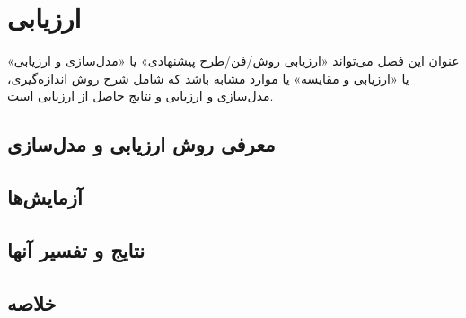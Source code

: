 
\chapter{ارزیابی}\label{chapter:4}
\thispagestyle{empty}
عنوان این فصل می‌تواند «ارزیابی روش/فن/طرح پیشنهادی» یا «مدل‌سازی و ارزیابی» یا «ارزیابی و مقایسه» یا موارد مشابه باشد كه شامل شرح روش اندازه‌گیری، مدل‌سازی و ارزیابی و نتایج حاصل از ارزیابی است.
   
   
   \section{معرفی روش ارزيابی و مدل‌سازی }
   
   
   \section{آزمایش‌ها }
   
   
      \section{نتایج و تفسیر آنها }
      
      
   
     \section{خلاصه}